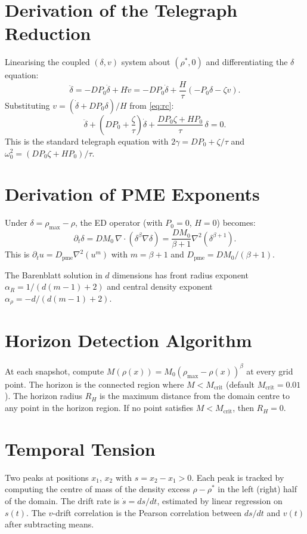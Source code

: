 \documentclass[11pt]{article}
\begin{document}
\section{Derivation of the Telegraph Reduction}

Linearising the coupled \((\delta, v)\) system about \((\rho^*, 0)\) and differentiating the \(\delta\) equation:
\[
  \ddot{\delta} = -DP_0\dot{\delta} + H\dot{v}
  = -DP_0\dot{\delta} + \frac{H}{\tau}(-P_0\delta - \zeta v).
\]
Substituting \(v = (\dot{\delta} + DP_0\delta)/H\) from \eqref{eq:rc}:
\[
  \ddot{\delta} + \left(DP_0 + \frac{\zeta}{\tau}\right)\dot{\delta}
  + \frac{DP_0\zeta + HP_0}{\tau}\,\delta = 0.
\]
This is the standard telegraph equation with \(2\gamma = DP_0 + \zeta/\tau\) and \(\omega_0^2 = (DP_0\zeta + HP_0)/\tau\).

\section{Derivation of PME Exponents}

Under \(\delta = \rho_{\max} - \rho\), the ED operator (with \(P_0 = 0\), \(H = 0\)) becomes:
\[
  \partial_t\delta = DM_0\,\nabla\!\cdot\!(\delta^\beta\nabla\delta)
  = \frac{DM_0}{\beta+1}\nabla^2(\delta^{\beta+1}).
\]
This is \(\partial_t u = D_{\mathrm{pme}}\nabla^2(u^m)\) with \(m = \beta + 1\) and \(D_{\mathrm{pme}} = DM_0/(\beta+1)\).

The Barenblatt solution in \(d\) dimensions has front radius exponent \(\alpha_R = 1/(d(m-1)+2)\) and central density exponent \(\alpha_\rho = -d/(d(m-1)+2)\).

\section{Horizon Detection Algorithm}

At each snapshot, compute \(M(\rho(x)) = M_0(\rho_{\max} - \rho(x))^\beta\) at every grid point. The horizon is the connected region where \(M < M_{\mathrm{crit}}\) (default \(M_{\mathrm{crit}} = 0.01\)). The horizon radius \(R_H\) is the maximum distance from the domain centre to any point in the horizon region. If no point satisfies \(M < M_{\mathrm{crit}}\), then \(R_H = 0\).

\section{Temporal Tension}

Two peaks at positions \(x_1\), \(x_2\) with \(s = x_2 - x_1 > 0\). Each peak is tracked by computing the centre of mass of the density excess \(\rho - \rho^*\) in the left (right) half of the domain. The drift rate is \(\dot{s} = ds/dt\), estimated by linear regression on \(s(t)\). The \(v\)-drift correlation is the Pearson correlation between \(ds/dt\) and \(v(t)\) after subtracting means.
\end{document}
